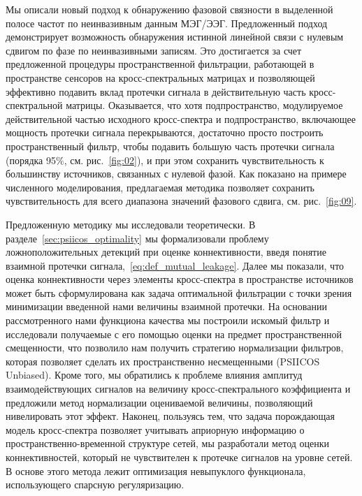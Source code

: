 \ifsynopsis

\else
Мы описали новый подход к обнаружению фазовой связности в выделенной полосе
частот по неинвазивным данным МЭГ/ЭЭГ. Предложенный подход демонстрирует
возможность обнаружения истинной линейной связи с нулевым сдвигом по фазе по
неинвазивными записям. Это достигается за счет предложенной процедуры
пространственной фильтрации,
работающей в пространстве сенсоров на кросс-спектральных матрицах и
позволяющей эффективно подавить вклад протечки сигнала в
действительную часть кросс-спектральной матрицы. Оказывается, что хотя
подпространство, модулируемое действительной частью исходного кросс-спектра и
подпространство, включающее мощность протечки сигнала перекрываются, достаточно
просто построить пространственный фильтр, чтобы подавить большую часть
протечки сигнала (порядка 95\%, см. рис.~\ref{fig:02}), и при этом сохранить
чувствительность к большинству источников, связанных с нулевой фазой. Как
показано на примере численного моделирования, предлагаемая методика позволяет
сохранить чувствительность для всего диапазона значений фазового сдвига, см. рис.~\ref{fig:09}.

Предложенную методику мы исследовали теоретически. В
разделе~\ref{sec:psiicos_optimality} мы формализовали проблему
ложноположительных детекций при оценке коннективности, введя понятие взаимной
протечки сигнала,~\ref{eq:def_mutual_leakage}.  Далее мы показали, что оценка
коннективности через элементы кросс-спектра в пространстве источников может
быть сформулирована как задача оптимальной фильтрации с точки зрения
минимизации введенной нами величины взаимной протечки. На основании
рассмотренного нами функциона качества мы построили искомый фильтр и
исследовали получаемые с его помощью оценки на предмет пространственной
смещенности, что позволило нам получить стратегию нормализации фильтров,
которая позволяет сделать их пространственно несмещенными (PSIICOS Unbiased).
Кроме того, мы обратились к проблеме влияния амплитуд взаимодействующих
сигналов на величину кросс-спектрального коэффициента и предложили метод
нормализации оцениваемой величины, позволяющий нивелировать этот эффект.
Наконец, пользуясь тем, что задача порождающая модель кросс-спектра позволяет
учитывать априорную информацию о пространственно-временной структуре сетей, мы
разработали метод оценки коннективностей, который не чувствителен к протечке
сигналов на уровне сетей. В основе этого метода лежит оптимизация невыпуклого
функционала, использующего спарсную регуляризацию.

